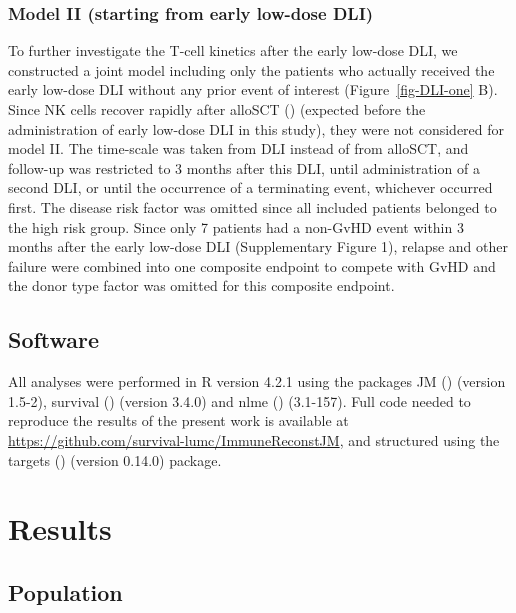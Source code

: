 \documentclass[
  letterpaper,
  paper=240mm:170mm,
  twoside=true,
  open=right,
  fontsize=10pt,
  pagesize=false,
  BCOR=15mm,
  DIV=14,
  headinclude=true,
  footinclude=false,
  headsepline=on]{scrbook}
\begin{document}
\subsubsection{Model II (starting from early low-dose
DLI)}\label{model-ii-starting-from-early-low-dose-dli}

To further investigate the T-cell kinetics after the early low-dose DLI,
we constructed a joint model including only the patients who actually
received the early low-dose DLI without any prior event of interest
(Figure~\ref{fig-DLI-one} B). Since NK cells recover rapidly after
alloSCT () (expected before the administration of early
low-dose DLI in this study), they were not considered for model II. The
time-scale was taken from DLI instead of from alloSCT, and follow-up was
restricted to 3 months after this DLI, until administration of a second
DLI, or until the occurrence of a terminating event, whichever occurred
first. The disease risk factor was omitted since all included patients
belonged to the high risk group. Since only 7 patients had a non-GvHD
event within 3 months after the early low-dose DLI (Supplementary Figure
1), relapse and other failure were combined into one composite endpoint
to compete with GvHD and the donor type factor was omitted for this
composite endpoint.

\subsection{Software}\label{software-2}

All analyses were performed in R version 4.2.1 using the packages JM
() (version
1.5-2), survival ()
(version 3.4.0) and nlme
() (3.1-157). Full code needed to reproduce the results of the
present work is available at
\url{https://github.com/survival-lumc/ImmuneReconstJM}, and structured
using the targets
() (version
0.14.0) package.

\section{Results}\label{results-3}

\subsection{Population}\label{population}
\end{document}
